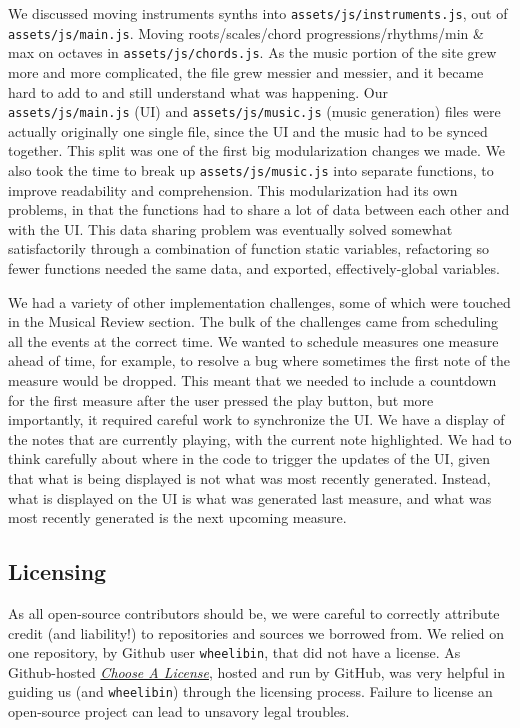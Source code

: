 \documentclass[12pt,a4paper]{article}
\newcommand{\code}{\texttt}
\begin{document}
We discussed moving instruments synths into \code{assets/js/instruments.js}, out of \code{assets/js/main.js}. Moving roots/scales/chord progressions/rhythms/min \& max on octaves in \code{assets/js/chords.js}. As the music portion of the site grew more and more complicated, the file grew messier and messier, and it became hard to add to and still understand what was happening. Our \code{assets/js/main.js} (UI) and \code{assets/js/music.js} (music generation) files were actually originally one single file, since the UI and the music had to be synced together. This split was one of the first big modularization changes we made. We also took the time to break up \code{assets/js/music.js} into separate functions, to improve readability and comprehension. This modularization had its own problems, in that the functions had to share a lot of data between each other and with the UI. This data sharing problem was eventually solved somewhat satisfactorily through a combination of function static variables, refactoring so fewer functions needed the same data, and exported, effectively-global variables.

We had a variety of other implementation challenges, some of which were touched in the Musical Review section. The bulk of the challenges came from scheduling all the events at the correct time. We wanted to schedule measures one measure ahead of time, for example, to resolve a bug where sometimes the first note of the measure would be dropped. This meant that we needed to include a countdown for the first measure after the user pressed the play button, but more importantly, it required careful work to synchronize the UI. We have a display of the notes that are currently playing, with the current note highlighted. We had to think carefully about where in the code to trigger the updates of the UI, given that what is being displayed is not what was most recently generated. Instead, what is displayed on the UI is what was generated last measure, and what was most recently generated is the next upcoming measure.

\subsection{Licensing}

As all open-source contributors should be, we were careful to correctly attribute credit (and liability!) to repositories and sources we borrowed from. We relied on one repository, by Github user \code{wheelibin}, that did not have a license. As Github-hosted \href{https://choosealicense.com/}{\textit{Choose A License}}, hosted and run by GitHub, was very helpful in guiding us (and \code{wheelibin}) through the licensing process. Failure to license an open-source project can lead to unsavory legal troubles.
\end{document}
